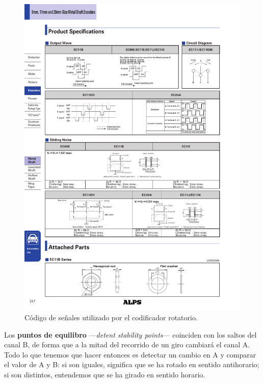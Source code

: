 \begin{figure}[H]
	\noindent \begin{centering}
		\includegraphics[width=\linewidth/3]{capitulo3/rotary_signal}
		\par\end{centering}
	\smallskip
	\caption{\label{fig:rotary_signal} Código de señales utilizado por el codificador rotatorio.}
\end{figure} 

\smallskip

Los \textbf{puntos de equilibro} ---\textit{detent stability points}--- coinciden con los saltos del canal B, de forma que a la mitad del recorrido de un giro cambiará el canal A. Todo lo que tenemos que hacer entonces es detectar un cambio en A y comparar el valor de A y B: si son iguales, significa que se ha rotado en sentido antihorario; si son distintos, entendemos que se ha girado en sentido horario.

